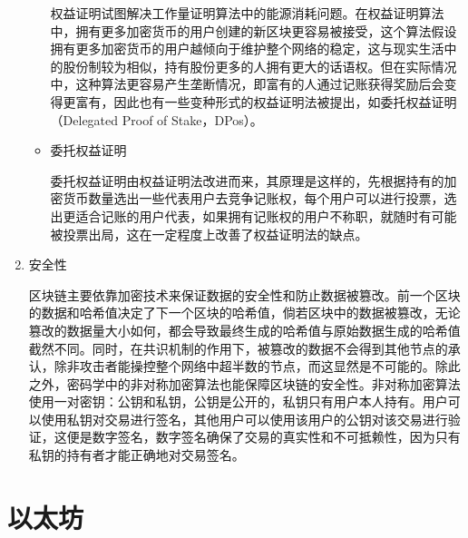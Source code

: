 \begin{enumerate}[label=\Alph*., align=left, leftmargin=*]
\begin{itemize}
        权益证明试图解决工作量证明算法中的能源消耗问题。在权益证明算法中，拥有更多加密货币的用户创建的新区块更容易被接受，这个算法假设拥有更多加密货币的用户越倾向于维护整个网络的稳定\cite{zheng2017overview}，这与现实生活中的股份制较为相似，持有股份更多的人拥有更大的话语权。但在实际情况中，这种算法更容易产生垄断情况，即富有的人通过记账获得奖励后会变得更富有，因此也有一些变种形式的权益证明法被提出，如委托权益证明（Delegated Proof of Stake，DPos）。
        \item 委托权益证明
        
        委托权益证明由权益证明法改进而来，其原理是这样的，先根据持有的加密货币数量选出一些代表用户去竞争记账权，每个用户可以进行投票，选出更适合记账的用户代表，如果拥有记账权的用户不称职，就随时有可能被投票出局，这在一定程度上改善了权益证明法的缺点。
    \end{itemize}
    \item 安全性
    
    区块链主要依靠加密技术来保证数据的安全性和防止数据被篡改。前一个区块的数据和哈希值决定了下一个区块的哈希值，倘若区块中的数据被篡改，无论篡改的数据量大小如何，都会导致最终生成的哈希值与原始数据生成的哈希值截然不同。同时，在共识机制的作用下，被篡改的数据不会得到其他节点的承认，除非攻击者能操控整个网络中超半数的节点，而这显然是不可能的。除此之外，密码学中的非对称加密算法也能保障区块链的安全性。非对称加密算法使用一对密钥：公钥和私钥，公钥是公开的，私钥只有用户本人持有。用户可以使用私钥对交易进行签名，其他用户可以使用该用户的公钥对该交易进行验证，这便是数字签名，数字签名确保了交易的真实性和不可抵赖性，因为只有私钥的持有者才能正确地对交易签名。
    
\end{enumerate}

\section{以太坊}
